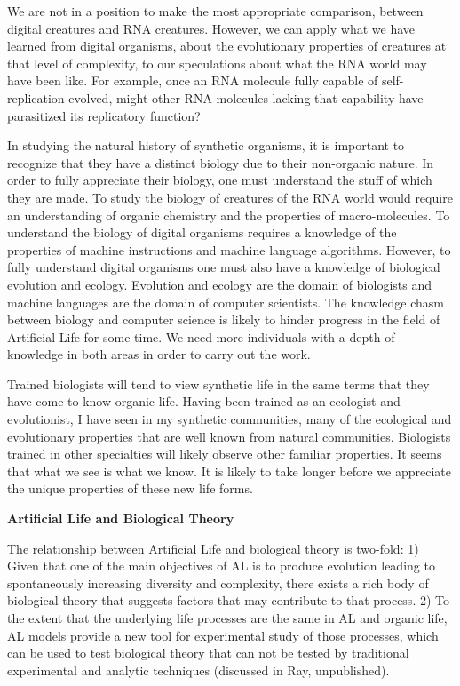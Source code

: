 We are not in a position to make the most appropriate comparison,
between digital creatures and RNA creatures.  However, we can apply what we
have learned from digital organisms, about the evolutionary properties of
creatures at that level of complexity, to our speculations about what the
RNA world may have been like.  For example, once an RNA molecule fully
capable of self-replication evolved, might other RNA molecules lacking
that capability have parasitized its replicatory function?

In studying the natural history of synthetic organisms, it is important to
recognize that they have a distinct biology due to their non-organic nature.
In order to fully appreciate their biology, one must understand the stuff of
which they are made.  To study the biology of creatures of the RNA world
would require an understanding of organic chemistry and the properties of
macro-molecules.  To understand the biology of digital organisms requires a
knowledge of the properties of machine instructions and machine language
algorithms.  However, to fully understand digital organisms one must also
have a knowledge of biological evolution and ecology.  Evolution and
ecology are the domain of biologists and machine languages are the domain
of computer scientists.  The knowledge chasm between biology and computer
science is likely to hinder progress in the field of Artificial Life for
some time.  We need more individuals with a depth of knowledge in both areas
in order to carry out the work.

Trained biologists will tend to view synthetic life in the same terms that
they have come to know organic life.  Having been trained as an ecologist
and evolutionist, I have seen in my synthetic communities, many of the
ecological and evolutionary properties that are well known from natural
communities.  Biologists trained in other specialties will likely observe
other familiar properties.  It seems that what we see is what we know.  It
is likely to take longer before we appreciate the unique properties of these
new life forms.

\LP
\bf Artificial Life and Biological Theory\rm
\eLP

The relationship between Artificial Life and biological theory is two-fold:
1) Given that one of the main objectives of AL is to produce evolution
leading to spontaneously increasing diversity and complexity, there exists
a rich body of biological theory that suggests factors that may
contribute to that process.
2) To the extent that the underlying life processes are the same in AL and
organic life, AL models provide a new tool for experimental study of those
processes, which can be used to test biological theory that can not be
tested by traditional experimental and analytic techniques (discussed in Ray,
unpublished).

